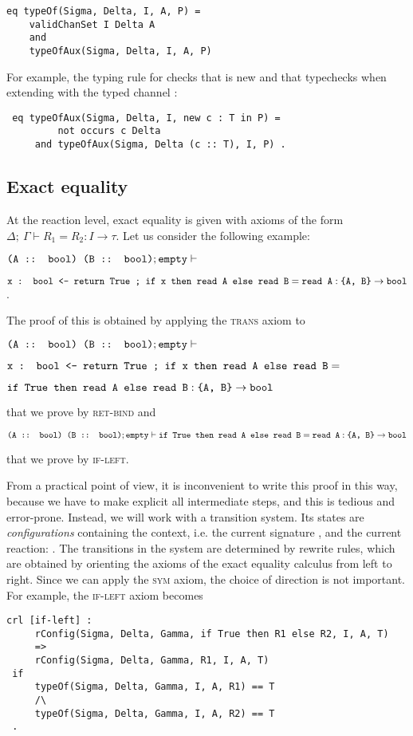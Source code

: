 \begin{lstlisting}
eq typeOf(Sigma, Delta, I, A, P) = 
    validChanSet I Delta A 
    and 
    typeOfAux(Sigma, Delta, I, A, P)
\end{lstlisting}

For example, the typing rule for  checks that  is new and that  typechecks
when extending  with the typed channel :
\begin{lstlisting}
 eq typeOfAux(Sigma, Delta, I, new c : T in P) =
         not occurs c Delta
     and typeOfAux(Sigma, Delta (c :: T), I, P) .   
\end{lstlisting}


\subsection{Exact equality}



At the reaction level, exact equality is given with axioms of the form
$\Delta; \ \Gamma \vdash R_1 = R_2 : I \to \tau$. 
Let us consider the following example:

$\texttt{(A :: bool) (B :: bool)}; \texttt{empty} \vdash$

$\texttt{x : bool <- return True  ; if x then read A else read B} = \texttt{read A} : \texttt{\{A, B\}} \to \texttt{bool}$. 

The proof of this is obtained by applying the \textsc{trans} axiom to

$\texttt{(A :: bool) (B :: bool)}; \texttt{empty} \vdash$

$\texttt{x : bool <- return True  ; if x then read A else read B} = 
$

$\texttt{if True then read A else read B} : \texttt{\{A, B\}} \to \texttt{bool}$

\noindent that we prove by \textsc{ret-bind} and

$\texttt{(A :: bool) (B :: bool)}; \texttt{empty} \vdash \texttt{if True then read A else read B} = \texttt{read A} : \texttt{\{A, B\}} \to \texttt{bool}$

\noindent that we prove by \textsc{if-left}. 

From a practical point of view, it is inconvenient to write this proof in this way, because we have to make explicit all intermediate steps, 
and this is tedious and error-prone. Instead, we will work with a
transition system. Its states are \emph{configurations} containing the context, i.e. the current signature ,
and the current reaction: .
The transitions in the system are determined by rewrite rules, 
which are obtained by orienting the axioms of the exact equality calculus
from left to right. Since we can apply the \textsc{sym} axiom,
the choice of direction is not important.
For example,
the \textsc{if-left} axiom becomes
\begin{lstlisting}
crl [if-left] : 
     rConfig(Sigma, Delta, Gamma, if True then R1 else R2, I, A, T) 
     =>  
     rConfig(Sigma, Delta, Gamma, R1, I, A, T)
 if
     typeOf(Sigma, Delta, Gamma, I, A, R1) == T
     /\
     typeOf(Sigma, Delta, Gamma, I, A, R2) == T 
 .
\end{lstlisting}

